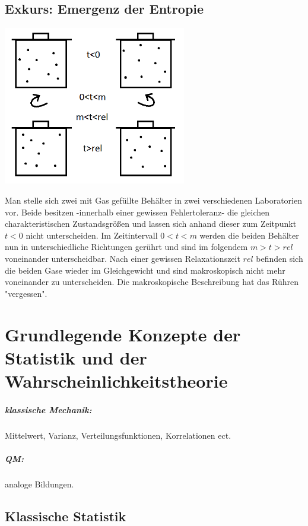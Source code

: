 	\section{Exkurs: Emergenz der Entropie}
	
	\begin{center}
		\includegraphics[width=0.6\textwidth]{Abb/Emergenz.png}
	\end{center}%
	Man stelle sich zwei mit Gas gefüllte Behälter in zwei verschiedenen Laboratorien vor. Beide besitzen -innerhalb einer gewissen Fehlertoleranz- die gleichen charakteristischen Zustandsgrößen und lassen sich anhand dieser zum Zeitpunkt $t<0$ nicht unterscheiden. Im Zeitintervall $0<t<m$ werden die beiden Behälter nun in unterschiedliche Richtungen gerührt und sind im folgendem $m>t>rel$ voneinander unterscheidbar. Nach einer gewissen Relaxationszeit $rel$ befinden sich die beiden Gase wieder im Gleichgewicht und sind makroskopisch nicht mehr voneinander zu unterscheiden. Die makroskopische Beschreibung hat das Rühren "vergessen". 

	
\chapter{Grundlegende Konzepte der Statistik und der Wahrscheinlichkeitstheorie}

	\paragraph{klassische Mechanik:}
		Mittelwert, Varianz, Verteilungsfunktionen, Korrelationen ect.
	\paragraph{QM:}
		analoge Bildungen.
		
	\section{Klassische Statistik}
	
